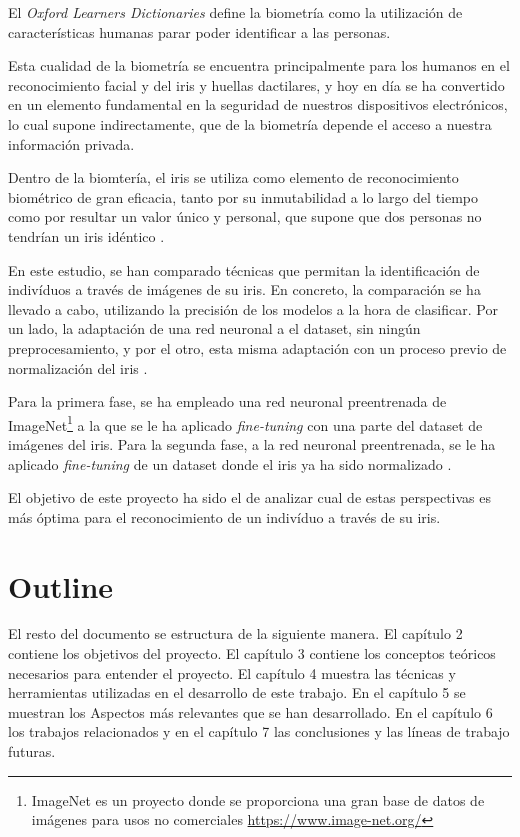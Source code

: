 
El \textit{Oxford Learners Dictionaries} define la biometría como la utilización de características humanas parar poder identificar a las personas.

Esta cualidad de la biometría se encuentra principalmente para los humanos en el reconocimiento facial y del iris y huellas dactilares, y hoy en día
se ha convertido en un elemento fundamental en la seguridad de nuestros dispositivos electrónicos, lo cual supone indirectamente,
que de la biometría depende el acceso a nuestra información privada.

Dentro de la biomtería, el iris se utiliza como elemento de reconocimiento biométrico de gran eficacia, tanto por su inmutabilidad a lo largo del tiempo como por resultar un valor único y 
personal, que supone que dos personas no tendrían un iris idéntico \cite{malgheet_iris_2021}. 

En este estudio, se han comparado técnicas que permitan la identificación de indivíduos a través de imágenes de su iris. 
En concreto, la comparación se ha llevado a cabo, utilizando la precisión de los modelos a la hora de clasificar. Por un lado, la adaptación de una red neuronal 
a el dataset, sin ningún preprocesamiento, y por el otro, esta misma adaptación con un proceso previo de normalización del iris .

Para la primera fase, se ha empleado una red neuronal preentrenada de ImageNet\footnote{ImageNet es un proyecto donde se proporciona una gran base de datos de imágenes para usos no comerciales \url{https://www.image-net.org/}} a la que se le ha aplicado \textit{fine-tuning} con una parte del dataset de imágenes del iris.
Para la segunda fase, a la red neuronal preentrenada, se le ha aplicado \textit{fine-tuning} de un dataset donde el iris ya ha sido normalizado \cite{tfg_iris_2020}.

El objetivo de este proyecto ha sido el de analizar cual de estas perspectivas es más óptima para el reconocimiento de un indivíduo a través de su iris.

\section{Outline}

El resto del documento se estructura de la siguiente manera. El capítulo 2  contiene los objetivos del proyecto. El capítulo 3  contiene los conceptos teóricos necesarios
para entender el proyecto. El capítulo 4  muestra las técnicas y herramientas utilizadas en el desarrollo de este trabajo. En el capítulo 5  se muestran los Aspectos
más relevantes que se han desarrollado. En el capítulo 6  los trabajos relacionados y en el capítulo 7  las conclusiones y las líneas de trabajo futuras.
